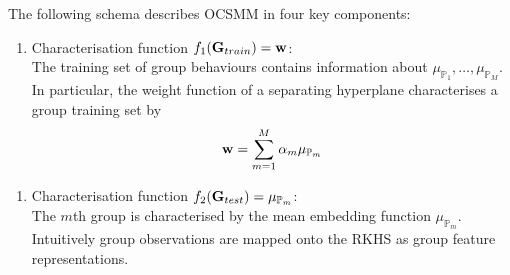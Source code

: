 The following schema describes OCSMM in four key components:   
 \begin{enumerate}[1.]
\item Characterisation function $f_1({\bf G}_{train})={\bf w}$: \\ The training set of group behaviours contains information about  $\mu_{\mathbb{P}_1},\dots, \mu_{\mathbb{P}_M}$.  In particular, the weight function of a separating hyperplane characterises a group training set by
\[{\bf w}= \sum_{m=1}^M \alpha_m  \mu_{\mathbb{P}_m}\] 
 \end{enumerate}
 \begin{enumerate}[2.]
 \item Characterisation function $f_2({\bf G}_{test})=\mu_{\mathbb{P}_m}$: \\ 
The $m$th group is characterised by the mean embedding function $\mu_{\mathbb{P}_m}$.  Intuitively group observations are mapped onto the RKHS as group feature  representations. 
\end{enumerate}
